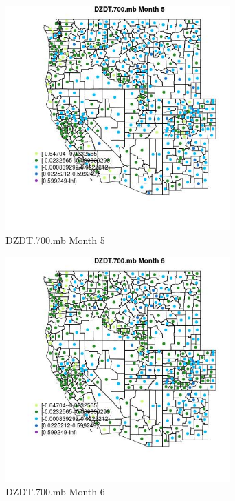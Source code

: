 \begin{figure} 
\centering  
\includegraphics[width=0.77\textwidth]{Code_Outputs/df_report_ML_predictors_CountyCentroid_Locations_Dates_2008-01-01to2018-12-31_MapObsMo5DZDT700mb.jpg} 
\caption{\label{fig:df_report_ML_predictors_CountyCentroid_Locations_Dates_2008-01-01to2018-12-31MapObsMo5DZDT700mb}DZDT.700.mb Month 5} 
\end{figure} 
 

\begin{figure} 
\centering  
\includegraphics[width=0.77\textwidth]{Code_Outputs/df_report_ML_predictors_CountyCentroid_Locations_Dates_2008-01-01to2018-12-31_MapObsMo6DZDT700mb.jpg} 
\caption{\label{fig:df_report_ML_predictors_CountyCentroid_Locations_Dates_2008-01-01to2018-12-31MapObsMo6DZDT700mb}DZDT.700.mb Month 6} 
\end{figure} 
 

